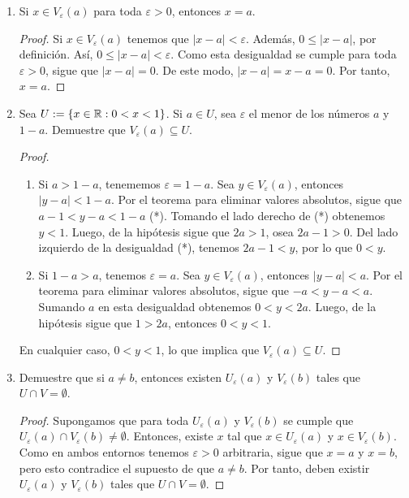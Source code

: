 \begin{enumerate}[label=\alph*)]
 \item Si $x\in V_\varepsilon(a)$ para toda $\varepsilon>0$, entonces $x=a$.
 \begin{proof} 
  Si $x\in V_\varepsilon(a)$ tenemos que $|x-a|<\varepsilon$. Además, $0\leq |x-a|$, por definición. Así, $0\leq |x-a|<\varepsilon$. Como esta desigualdad se cumple para toda $\varepsilon>0$, sigue que $|x-a|=0$. De este modo, $|x-a|=x-a=0$. Por tanto, $x=a$. 
 \end{proof}
 
 \item Sea $U:=\{x\in \mathbb{R}: 0<x<1\}$. Si $a\in U$, sea $\varepsilon$ el menor de los números $a$ y $1-a$. Demuestre que $V_\varepsilon(a) \subseteq U$.
 \begin{proof} \leavevmode
  \begin{enumerate}[label=\roman*)]
   \item Si $a>1-a$, tenememos $\varepsilon=1-a$. Sea $y\in V_\varepsilon(a)$, entonces $|y-a|<1-a$. Por el teorema para eliminar valores absolutos, sigue que $a-1<y-a<1-a$ (*). Tomando el lado derecho de (*) obtenemos $y<1$. Luego, de la hipótesis sigue que $2a>1$, osea $2a-1>0$. Del lado izquierdo de la desigualdad (*), tenemos $2a-1<y$, por lo que $0<y$.
   \item Si $1-a>a$, tenemos $\varepsilon=a$. Sea $y\in V_\varepsilon(a)$, entonces $|y-a|<a$. Por el teorema para eliminar valores absolutos, sigue que $-a<y-a<a$. Sumando $a$ en esta desigualdad obtenemos $0<y<2a$. Luego, de la hipótesis sigue que $1>2a$, entonces $0<y<1$.\end{enumerate}
   En cualquier caso, $0<y<1$, lo que implica que $V_\varepsilon(a) \subseteq U$. 
 \end{proof}

 \item Demuestre que si $a\neq b$, entonces existen $U_\varepsilon(a)$ y $V_\varepsilon(b)$ tales que $U\cap V =\emptyset$.
 \begin{proof} 
  Supongamos que para toda $U_\varepsilon(a)$ y $V_\varepsilon(b)$ se cumple que $U_\varepsilon(a) \cap V_\varepsilon(b) \neq \emptyset$. Entonces, existe $x$ tal que $x\in U_\varepsilon(a)$ y $x\in V_\varepsilon(b)$. Como en ambos entornos tenemos $\varepsilon>0$ arbitraria, sigue que $x=a$ y $x=b$, pero esto contradice el supuesto de que $a\neq b$. Por tanto, deben existir $U_\varepsilon(a)$ y $V_\varepsilon(b)$ tales que $U\cap V =\emptyset$. 
 \end{proof}
\end{enumerate}

